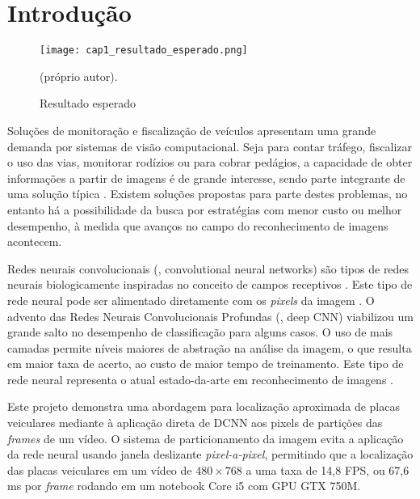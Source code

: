 
\chapter{Introdução}

\begin{figure}[!htb]
	\centering
	\texttt{[image: cap1\_resultado\_esperado.png]}
	\caption{Resultado esperado}
	\label{fig:cap1_resultado_esperado}
	(próprio autor).
\end{figure}

Soluções de monitoração e fiscalização de veículos apresentam
uma grande demanda por sistemas de visão computacional. Seja
para contar tráfego, fiscalizar o uso das vias, monitorar
rodízios ou para cobrar pedágios, a capacidade de obter
informações a partir de imagens é de grande interesse, sendo parte integrante
de uma solução típica \cite{anagnostopoulos2008license}.  Existem
soluções propostas para parte destes problemas, no entanto há a
possibilidade da busca por estratégias com menor custo ou melhor
desempenho, à medida que avanços no campo do reconhecimento de
imagens acontecem.

Redes neurais convolucionais (, convolutional neural networks)
são tipos de redes neurais biologicamente inspiradas no conceito
de campos receptivos \cite{hubel1968receptive}. Este tipo de
rede neural pode ser alimentado
diretamente com os \emph{pixels} da imagem \cite{lecun1998gradient}. O
advento das Redes Neurais Convolucionais Profundas (, deep CNN)
viabilizou um grande salto no desempenho de classificação para alguns casos.
O uso de mais camadas permite níveis maiores de
abstração na análise da imagem, o que resulta em maior taxa de
acerto, ao custo de maior tempo de treinamento. Este tipo de rede
neural representa o atual estado-da-arte em reconhecimento de
imagens \cite{szegedy2015going}.

Este projeto demonstra uma abordagem para localização aproximada de placas
veiculares mediante à aplicação direta de DCNN aos pixels de partições das
\emph{frames} de um vídeo. O sistema de particionamento da imagem evita a
aplicação da rede neural usando janela deslizante \emph{pixel-a-pixel},
permitindo que a localização das
placas veiculares em um vídeo de $480 \times 768$ a uma taxa de 14,8 FPS, ou
67,6 ms por \emph{frame} rodando em um notebook Core i5 com GPU GTX 750M.

